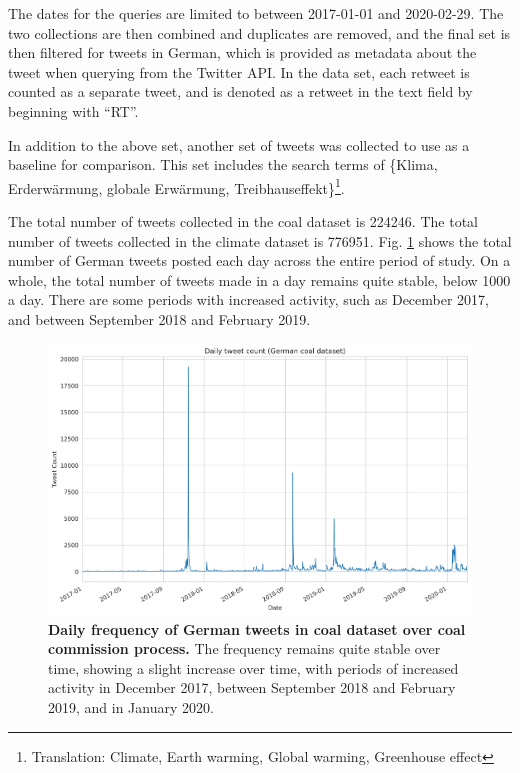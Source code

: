 \documentclass[12pt,onecolumn,twoside]{layout}
\begin{document}
The dates for the queries are limited to between 2017-01-01 and 2020-02-29. The two collections are then combined and duplicates are removed, and the final set is then filtered for tweets in German, which is provided as metadata about the tweet when querying from the Twitter API. In the data set, each retweet is counted as a separate tweet, and is denoted as a retweet in the text field by beginning with ``RT''. 

In addition to the above set, another set of tweets was collected to use as a baseline for comparison. This set includes the search terms of \{Klima, Erderwärmung, globale Erwärmung, Treibhauseffekt\}\footnote{Translation: Climate, Earth warming, Global warming, Greenhouse effect}.

The total number of tweets collected in the coal dataset is 224246. The total number of tweets collected in the climate dataset is 776951. Fig. \ref{fig:tweet_frequency} shows the total number of German tweets posted each day across the entire period of study. On a whole, the total number of tweets made in a day remains quite stable, below 1000 a day. There are some periods with increased activity, such as December 2017, and between September 2018 and February 2019. 

\begin{figure} 
	\begin{center}
		\includegraphics[width=0.9\linewidth]{figures/sa_tweet_frequency_zoom4}
	\end{center}
	\caption{\textbf{Daily frequency of German tweets in coal dataset over coal commission process.} The frequency remains quite stable over time, showing a slight increase over time, with periods of increased activity in December 2017, between September 2018 and February 2019, and in January 2020.}
	\label{fig:tweet_frequency}
\end{figure}
\end{document}
